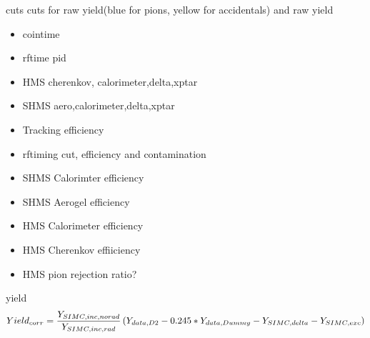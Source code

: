 \documentclass[aspectratio=169,xcolor=dvipsnames]{beamer}
\begin{document}
\begin{frame}{cuts}
cuts for raw yield(blue for pions, yellow for accidentals) and raw yield %
    \begin{itemize}
        \item cointime
        \item rftime pid
        \item HMS cherenkov, calorimeter,delta,xptar
        \item SHMS aero,calorimeter,delta,xptar
    \end{itemize}%

\begin{itemize}
    \item Tracking efficiency
    \item rftiming cut, efficiency and contamination
    \item SHMS Calorimter efficiency
    \item SHMS Aerogel efficiency
    \item HMS Calorimeter efficiency 
    \item HMS Cherenkov effiiciency
    \item HMS pion rejection ratio?   
\end{itemize}

\end{frame}
\begin{frame}{yield}
    $$Yield_{corr} = \frac{Y_{SIMC,inc,norad}}{Y_{SIMC,inc,rad}} \\
    \left(Y_{data,D2}-0.245*Y_{data,Dummy}-Y_{SIMC,delta}-Y_{SIMC,exc}\right)$$
\end{frame}

\end{document}
